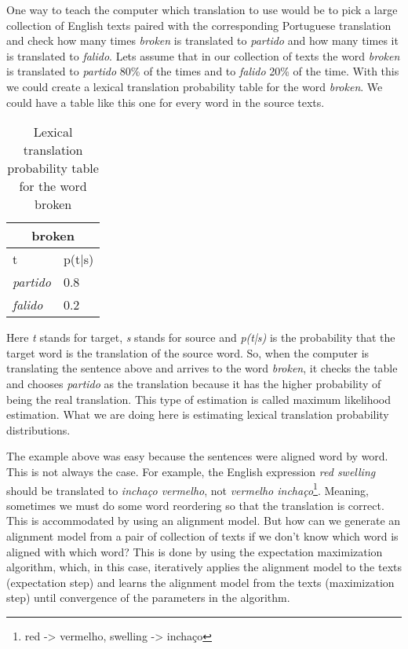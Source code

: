 One way to teach the computer which translation to use would be to pick a large collection of English texts paired with the corresponding Portuguese translation and check how many times \textit{broken} is translated to \textit{partido} and how many times it is translated to \textit{falido}. Lets assume that in our collection of texts the word \textit{broken} is translated to \textit{partido} 80\% of the times and to \textit{falido} 20\% of the time. With this we could create a lexical translation probability table for the word \textit{broken}. We could have a table like this one for every word in the source texts.

\begin{table}[ht]
\centering
\begin{tabular}{ll}
\multicolumn{2}{c}{\textbf{broken}} \\ \hline
t                     & p(t|s)      \\ \hline
\textit{partido}      & 0.8         \\
\textit{falido}       & 0.2         \\ \hline
\end{tabular}
\caption{Lexical translation probability table for the word broken}
\label{table:translation-prob-table}
\end{table}

Here \textit{t} stands for target, \textit{s} stands for source and \textit{p(t|s)} is the probability that the target word is the translation of the source word. So, when the computer is translating the sentence above and arrives to the word \textit{broken}, it checks the table and chooses \textit{partido} as the translation because it has the higher probability of being the real translation. This type of estimation is called maximum likelihood estimation. What we are doing here is estimating lexical translation probability distributions.

The example above was easy because the sentences were aligned word by word. This is not always the case. For example, the English expression \textit{red swelling} should be translated to \textit{inchaço vermelho}, not \textit{vermelho inchaço}\footnote{red -> vermelho, swelling -> inchaço}. Meaning, sometimes we must do some word reordering so that the translation is correct. This is accommodated by using an alignment model. But how can we generate an alignment model from a pair of collection of texts if we don't know which word is aligned with which word? This is done by using the expectation maximization algorithm, which, in this case, iteratively applies the alignment model to the texts (expectation step) and learns the alignment model from the texts (maximization step) until convergence of the parameters in the algorithm. 

